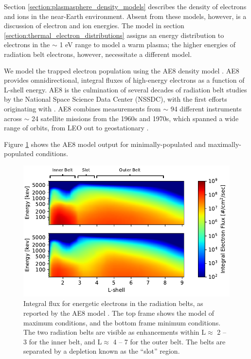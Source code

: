 Section \ref{section:plasmasphere_density_models} describes the density of electrons and ions in the near-Earth environment. Absent from these models, however, is a discussion of electron and ion energies. The model in section \ref{section:thermal_electron_distributions} assigns an energy distribution to electrons in the $\sim$ 1 eV range to model a warm plasma; the higher energies of radiation belt electrons, however, necessitate a different model.

We model the trapped electron population using the AE8 density model \citep{Vette1991}. AE8 provides omnidirectional, integral fluxes of high-energy electrons as a function of L-shell energy. AE8 is the culmination of several decades of radiation belt studies by the National Space Science Data Center (NSSDC), with the first efforts originating with \cite{Vette1966}. AE8 combines measurements from $\sim$ 94 different instruments across $\sim$ 24 satellite missions from the 1960s and 1970s, which spanned a wide range of orbits, from LEO out to geostationary \citep{Cayton2005}.

Figure \ref{fig:AE8_model} shows the AE8 model output for minimally-populated and maximally-populated conditions. 

\begin{figure}
\begin{center}
\includegraphics{figures/AE8_fluxes.pdf}
\caption[AE8 integral flux model]{Integral flux for energetic electrons in the radiation belts, as reported by the AE8 model \citep{Vette1991}. The top frame shows the model of maximum conditions, and the bottom frame minimum conditions. The two radiation belts are visible as enhancements within L$\approx$ 2 -- 3 for the inner belt, and L$\approx$ 4 -- 7 for the outer belt. The belts are separated by a depletion known as the ``slot'' region.}
\label{fig:AE8_model}
\end{center}
\end{figure}

